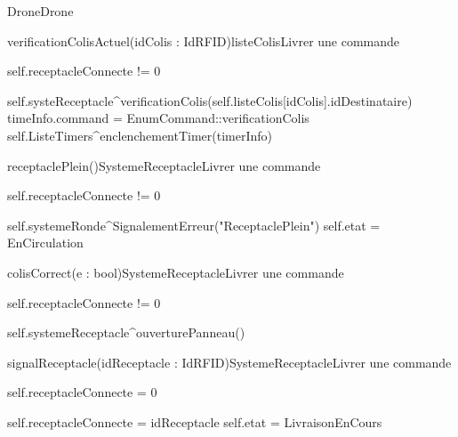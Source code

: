 \begin{OM}{Drone}{Drone}
    \begin{OMOperation}{verificationColisActuel(idColis : IdRFID)}{listeColis}{Livrer une commande}
        \begin{OMMessages}
        \end{OMMessages}
        \begin{OMPre}
self.receptacleConnecte != 0
        \end{OMPre}
        \begin{OMPost}
self.systeReceptacle^verificationColis(self.listeColis[idColis].idDestinataire)
timeInfo.command = EnumCommand::verificationColis
self.ListeTimers^enclenchementTimer(timerInfo)
        \end{OMPost}
    \end{OMOperation}

    \begin{OMOperation}{receptaclePlein()}{SystemeReceptacle}{Livrer une commande}
        \begin{OMMessages}
        \end{OMMessages}
        \begin{OMPre}
self.receptacleConnecte != 0
        \end{OMPre}
        \begin{OMPost}
self.systemeRonde^SignalementErreur("ReceptaclePlein")
self.etat = EnCirculation
        \end{OMPost}
    \end{OMOperation}

    \begin{OMOperation}{colisCorrect(e : bool)}{SystemeReceptacle}{Livrer une commande}
        \begin{OMMessages}
        \end{OMMessages}
        \begin{OMPre}
self.receptacleConnecte != 0
        \end{OMPre}
        \begin{OMPost}
self.systemeReceptacle^ouverturePanneau()
        \end{OMPost}
    \end{OMOperation}

    \begin{OMOperation}{signalReceptacle(idReceptacle : IdRFID)}{SystemeReceptacle}{Livrer une commande}
        \OMNoMessages
        \begin{OMPre}
self.receptacleConnecte = 0
        \end{OMPre}
        \begin{OMPost}
self.receptacleConnecte = idReceptacle
self.etat = LivraisonEnCours
        \end{OMPost}
    \end{OMOperation}


\end{OM}
